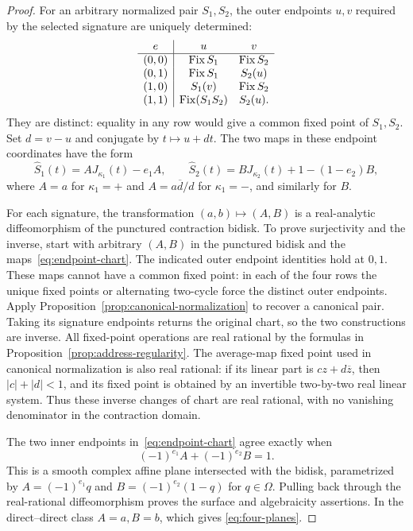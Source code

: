 \begin{proof}
For an arbitrary normalized pair $S_1,S_2$, the outer endpoints
$u,v$ required by the selected signature are uniquely determined:
\[
\begin{array}{c|cc}
e&u&v\\\hline
(0,0)&\operatorname{Fix} S_1&\operatorname{Fix} S_2\\
(0,1)&\operatorname{Fix} S_1&S_2(u)\\
(1,0)&S_1(v)&\operatorname{Fix} S_2\\
(1,1)&\operatorname{Fix}(S_1S_2)&S_2(u).
\end{array}
\]
They are distinct: equality in any row would give a common fixed
point of $S_1,S_2$. Set $d=v-u$ and conjugate by $t\mapsto u+dt$.
The two maps in these endpoint coordinates have the form
\begin{equation}\label{eq:endpoint-chart}
\widehat S_1(t)=A J_{\kappa_1}(t)-e_1A,\qquad
\widehat S_2(t)=B J_{\kappa_2}(t)+1-(1-e_2)B,
\end{equation}
where $A=a$ for $\kappa_1=+$ and
$A=a\overline d/d$ for $\kappa_1=-$, and similarly for $B$.

For each signature, the transformation $(a,b)\mapsto(A,B)$ is a
real-analytic diffeomorphism of the punctured contraction bidisk. To prove
surjectivity and the inverse, start with arbitrary $(A,B)$ in the
punctured bidisk and the maps~\eqref{eq:endpoint-chart}. The indicated outer
endpoint identities hold at $0,1$. These maps cannot have a common
fixed point: in each of the four rows the unique fixed points or
alternating two-cycle force the distinct outer endpoints. Apply
Proposition~\ref{prop:canonical-normalization} to recover a canonical
pair. Taking its signature endpoints returns the original chart,
so the two constructions are inverse. All fixed-point operations
are real rational by the formulas in
Proposition~\ref{prop:address-regularity}. The average-map fixed
point used in canonical normalization is also real rational: if
its linear part is $cz+d\overline z$, then $|c|+|d|<1$, and its
fixed point is obtained by an invertible two-by-two real linear
system. Thus these inverse changes of chart are real rational,
with no vanishing denominator in the contraction domain.

The two inner endpoints in~\eqref{eq:endpoint-chart} agree exactly
when
\[
(-1)^{e_1}A+(-1)^{e_2}B=1.
\]
This is a smooth complex affine plane intersected with the bidisk,
parametrized by $A=(-1)^{e_1}q$ and
$B=(-1)^{e_2}(1-q)$ for $q\in\Omega$. Pulling back through the
real-rational diffeomorphism proves the surface and algebraicity
assertions. In the direct--direct class $A=a,B=b$, which gives
\eqref{eq:four-planes}.
\end{proof}

